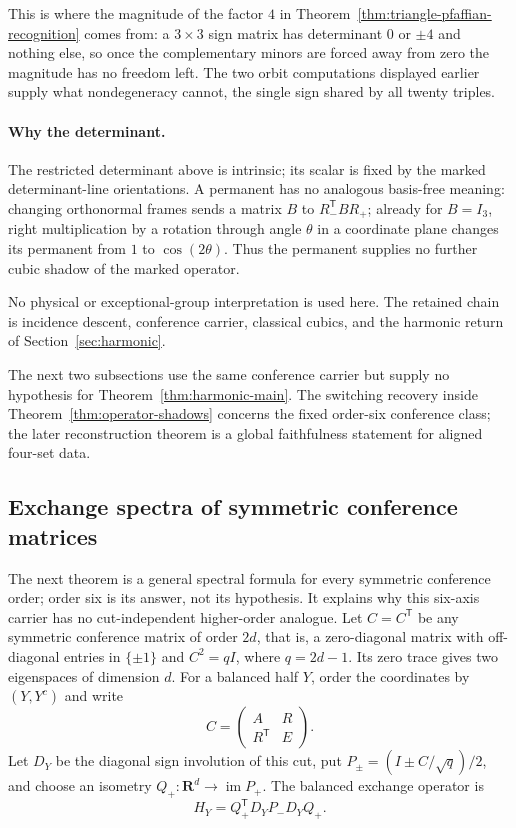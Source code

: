 This is where the magnitude of the factor \(4\) in
Theorem~\ref{thm:triangle-pfaffian-recognition} comes from: a \(3\times3\)
sign matrix has determinant \(0\) or \(\pm4\) and nothing else, so once the
complementary minors are forced away from zero the magnitude has no freedom
left.  The two orbit computations displayed earlier supply what nondegeneracy
cannot, the single sign shared by all twenty triples.

\paragraph{Why the determinant.}
The restricted determinant above is intrinsic; its scalar is fixed by the
marked determinant-line orientations.  A permanent has no analogous
basis-free meaning: changing orthonormal frames sends a matrix \(B\) to
\(R_-^{\mathsf T}BR_+\); already for \(B=I_3\), right multiplication by a
rotation through angle \(\theta\) in a coordinate plane changes its permanent
from \(1\) to \(\cos(2\theta)\).  Thus the permanent supplies no further cubic
shadow of the marked operator.

No physical or exceptional-group interpretation is used here.  The retained
chain is incidence descent, conference carrier, classical cubics, and the
harmonic return of Section~\ref{sec:harmonic}.

The next two subsections use the same conference
carrier but supply no hypothesis for Theorem~\ref{thm:harmonic-main}.  The
switching recovery inside Theorem~\ref{thm:operator-shadows} concerns the fixed
order-six conference class; the later reconstruction theorem is a global
faithfulness statement for aligned four-set data.

\subsection{Exchange spectra of symmetric conference matrices}
\label{sec:exchange-spectra}

The next theorem is a general spectral formula for every symmetric conference
order; order six is its answer, not its hypothesis.  It explains why this
six-axis carrier has no cut-independent higher-order analogue.  Let \(C=C^{\mathsf T}\) be any symmetric conference
matrix of order \(2d\), that is, a zero-diagonal matrix with off-diagonal
entries in \(\{\pm1\}\) and \(C^2=qI\), where \(q=2d-1\).  Its zero trace
gives two eigenspaces of dimension \(d\).  For a balanced half
\(Y\), order the coordinates by \((Y,Y^c)\) and write
\[
 C=\begin{pmatrix}A&R\\R^{\mathsf T}&E\end{pmatrix}.
\]
Let \(D_Y\) be the diagonal sign involution of this cut, put
\(P_\pm=(I\pm C/\sqrt q)/2\), and choose an isometry
\(Q_+:\mathbf R^d\to\operatorname{im}P_+\).  The balanced exchange operator
is
\[
 H_Y=Q_+^{\mathsf T}D_YP_-D_YQ_+.
\]

